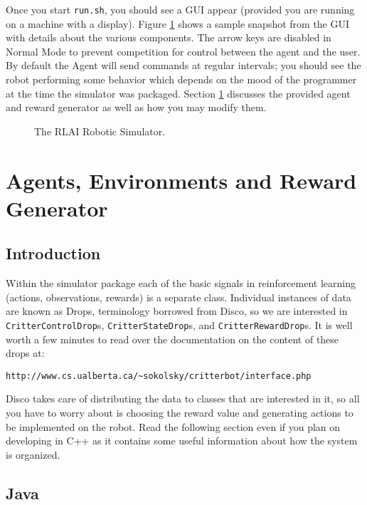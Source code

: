 \documentclass[12pt]{article}
\begin{document}
Once you start \verb+run.sh+, you should see a GUI appear (provided you are
running on a machine with a display). Figure \ref{fig:gui} shows a sample
snapshot from the GUI with details about the various components.
The arrow keys are disabled in Normal Mode to prevent competition for control 
between the agent and the user. 
By default the Agent will send commands at regular intervals;
you should see the robot performing some behavior which depends on the mood
of the programmer at the time the simulator was packaged. Section 
\ref{sec:writingAgentAndRewardGenerator} discusses the provided agent and
reward generator as well as how you may modify them. 

\begin{figure}\label{fig:gui}
\centerline{
}
\caption{The RLAI Robotic Simulator.}
\end{figure}

\section{Agents, Environments and Reward Generator}\label{sec:writingAgentAndRewardGenerator}

\subsection{Introduction}\label{subsec:programming_introduction}

Within the simulator package each of the basic signals in reinforcement learning (actions, observations, rewards) is a separate class.  Individual instances of data are known as Drops, terminology borrowed from Disco, so we are interested in \verb+CritterControlDrop+s, \verb+CritterStateDrop+s, and \verb+CritterRewardDrop+s.  It is well worth a few minutes to read over the documentation on the content of these drops at:

\begin{verbatim}
http://www.cs.ualberta.ca/~sokolsky/critterbot/interface.php
\end{verbatim}

Disco takes care of distributing the data to classes that are interested in it, so all you have to worry about is choosing the reward value and generating actions to be implemented on the robot.  Read the following section even if you plan on developing in C++ as it contains some useful information about how the system is organized.

\subsection{Java}\label{subsec:java_agent}
\end{document}
